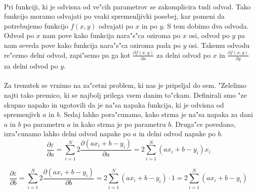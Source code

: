 \paragraph{}
Pri funkciji, ki je odvisna od ve"cih parametrov se zakomplicira tudi odvod. Tako funkcijo moramo odvajati po vsaki spremenljivki posebej, kar pomeni da potrebujemo funkcijo $f(x,y)$ odvajati po $x$ in po $y$. S tem dobimo dva odvoda. Odvod po $x$ nam pove kako funkcija nara"s"ca oziroma po $x$ osi, odvod po $y$ pa nam seveda pove kako funkcija nara"s"ca oziroma pada po $y$ osi. Takemu odvodu re"cemo delni odvod, zapi"semo pa ga kot $\frac{\partial f(x,y)}{\partial x}$ za delni odvod po $x$ in $\frac{\partial f(x,y)}{\partial y}$ za delni odvod po $y$.

\paragraph{}
Za trenutek se vrnimo na za"cetni problem, ki nas je pripeljal do sem. "Zelelimo najti tako premico, ki se najbolj prilega vsem danim to"ckam. Definirali smo "ze skupno napako in ugotovili da je na"sa napaka funkcija, ki je odvisna od spremenjivk $a$ in $b$. Sedaj lahko pora"cunamo, kako strma je na"sa napaka za dani $a$ in $b$ po parametru $a$ in kako strma je po parametru $b$. Druga"ce povedano, izra"cunamo lahko delni odvod napake po $a$ in delni odvod napake po $b$.
$$\frac{\partial \varepsilon}{\partial a} =
\sum_{i=1}^{N} 2 \frac{\partial (a x_i + b - y_i)}{\partial a} =
2 \sum_{i=1}^{N} (a x_i + b - y_i)x_i$$

$$\frac{\partial \varepsilon}{\partial b} =
\sum_{i=1}^{N} 2 \frac{\partial (a x_i + b - y_i)}{\partial b} =
2 \sum_{i=1}^{N} (a x_i + b - y_i)\cdot1 = 2 \sum_{i=1}^{N} (a x_i + b - y_i)$$